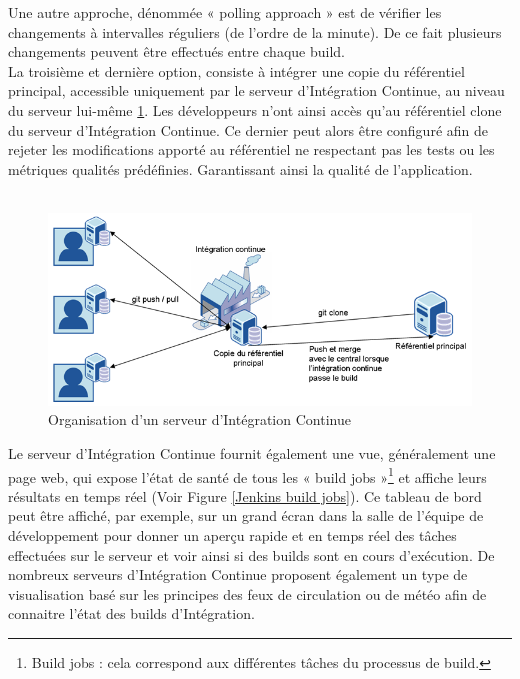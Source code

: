     Une autre approche, dénommée « polling approach » \cite{Duv07} est de vérifier les changements à intervalles réguliers (de l’ordre de la minute). De ce fait plusieurs changements peuvent être effectués entre chaque build.\\

    La troisième et dernière option, consiste à intégrer une copie du référentiel principal, accessible uniquement par le serveur d’Intégration Continue, au niveau du serveur lui-même \ref{IC server}. Les développeurs n’ont ainsi accès qu’au référentiel clone du serveur d’Intégration Continue. Ce dernier peut alors être configuré afin de rejeter les modifications apporté au référentiel ne respectant pas les tests ou les métriques qualités prédéfinies. Garantissant ainsi la qualité de l’application.\\\\

    \begin{figure}
      \begin{center}
        \includegraphics[scale=0.5]{images/ICServer.png}
      \end{center}
      \caption{Organisation d'un serveur d'Intégration Continue}
      \label{IC server}
    \end{figure}

    Le serveur d’Intégration Continue fournit également une vue, généralement une page web, qui expose l'état de santé de tous les « \gls{build jobs} »\footnote{Build jobs : cela correspond aux différentes tâches du processus de build.} et affiche leurs résultats en temps réel (Voir Figure \ref{Jenkins build jobs}). Ce tableau de bord peut être affiché, par exemple, sur un grand écran dans la salle de l'équipe de développement pour donner un aperçu rapide et en temps réel des tâches effectuées sur le serveur et voir ainsi si des builds sont en cours d'exécution. De nombreux serveurs d’Intégration Continue proposent également un type de visualisation basé sur les principes des feux de circulation ou de météo afin de connaitre l’état des builds d’Intégration.\\

